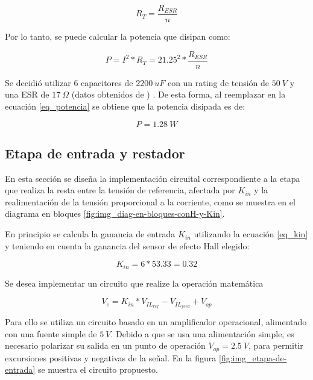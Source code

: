 \begin{equation} 
	R_T = \frac{R_{ESR}}{n}
\end{equation}

\noindent Por lo tanto, se puede calcular la potencia que disipan como:

\begin{equation}\label{eq_potencia} 
	P = I^2 * R_T = 21.25^2 * \frac{R_{ESR}}{n}
\end{equation}

\noindent Se decidió utilizar 6 capacitores  de $2200 \:uF$ con un rating de tensión de $50\:V$ y una ESR de $17 \:\Omega$ (datos obtenidos de \cite{EKY-350ELL222MM25S}) . De esta forma, al reemplazar en la ecuación \ref{eq_potencia} se obtiene que la potencia disipada es de: 

\begin{equation} 
	P=1.28\:W
\end{equation}

\subsection{Etapa de entrada y restador}

En esta sección se diseña la implementación circuital correspondiente a la etapa que realiza la resta entre la tensión de referencia, afectada por $K_{in}$ y la realimentación de la tensión proporcional a la corriente, como se muestra en el diagrama en bloques \ref{fig:img_diag-en-bloques-conH-y-Kin}.



En principio se calcula la ganancia de entrada $K_{in}$ utilizando la ecuación \ref{eq_kin} y teniendo en cuenta la ganancia del sensor de efecto Hall elegido:

\begin{equation}
	K_{in}=6*53.33=0.32
\end{equation}

Se desea implementar un circuito que realize la operación matemática 

\begin{equation}
	V_e=K_{in}*V_{IL_{ref}} - V_{IL_{feed}} + V_{op}
\end{equation}

Para ello se utiliza un circuito basado en un amplificador operacional, alimentado con una fuente simple de $5\:V$. Debido a que se usa una alimentación simple, es necesario polarizar su salida en un punto de operación $V_{op}=2.5\:V$, para permitir excursiones positivas y negativas de la señal. En la figura \ref{fig:img_etapa-de-entrada} se muestra el circuito propuesto. 



